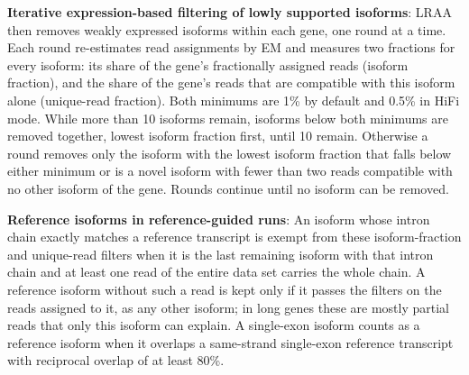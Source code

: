 \textbf{Iterative expression-based filtering of lowly supported isoforms}: LRAA then removes weakly expressed isoforms within each gene, one round at a time. Each round re-estimates read assignments by EM and measures two fractions for every isoform: its share of the gene's fractionally assigned reads (isoform fraction), and the share of the gene's reads that are compatible with this isoform alone (unique-read fraction). Both minimums are 1\% by default and 0.5\% in HiFi mode. While more than 10 isoforms remain, isoforms below both minimums are removed together, lowest isoform fraction first, until 10 remain. Otherwise a round removes only the isoform with the lowest isoform fraction that falls below either minimum or is a novel isoform with fewer than two reads compatible with no other isoform of the gene. Rounds continue until no isoform can be removed.

\textbf{Reference isoforms in reference-guided runs}: An isoform whose intron chain exactly matches a reference transcript is exempt from these isoform-fraction and unique-read filters when it is the last remaining isoform with that intron chain and at least one read of the entire data set carries the whole chain. A reference isoform without such a read is kept only if it passes the filters on the reads assigned to it, as any other isoform; in long genes these are mostly partial reads that only this isoform can explain. A single-exon isoform counts as a reference isoform when it overlaps a same-strand single-exon reference transcript with reciprocal overlap of at least 80\%. 

